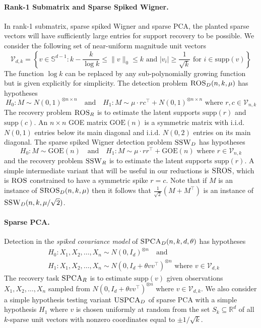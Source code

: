 \paragraph{Rank-1 Submatrix and Sparse Spiked Wigner.} In rank-1 submatrix, sparse spiked Wigner and sparse PCA, the planted sparse vectors will have sufficiently large entries for support recovery to be possible. We consider the following set of near-uniform magnitude unit vectors
$$\mathcal{V}_{d,k} = \left\{ v \in \mathbb{S}^{d-1}  : k - \frac{k}{\log k} \le \| v \|_0 \le k \text{ and } |v_i| \ge \frac{1}{\sqrt{k}} \text{ for } i \in \text{supp}(v) \right\}$$
The function $\log k$ can be replaced by any sub-polynomially growing function but is given explicitly for simplicity. The detection problem $\textsc{ROS}_D(n, k, \mu)$ has hypotheses
$$H_0: M \sim N(0, 1)^{\otimes n \times n} \quad \text{and} \quad H_1 : M \sim \mu \cdot rc^\top + N(0, 1)^{\otimes n \times n} \text{ where } r, c \in \mathcal{V}_{n, k}$$
The recovery problem $\textsc{ROS}_R$ is to estimate the latent supports $\text{supp}(r)$ and $\text{supp}(c)$. An $n \times n$ GOE matrix $\text{GOE}(n)$ is a symmetric matrix with i.i.d. $N(0, 1)$ entries below its main diagonal and i.i.d. $N(0, 2)$ entries on its main diagonal. The sparse spiked Wigner detection problem $\textsc{SSW}_D$ has hypotheses
$$H_0: M \sim \text{GOE}(n) \quad \text{and} \quad H_1 : M \sim \mu \cdot rr^\top + \text{GOE}(n) \text{ where } r \in \mathcal{V}_{n, k}$$
and the recovery problem $\textsc{SSW}_R$ is to estimate the latent supports $\text{supp}(r)$. A simple intermediate variant that will be useful in our reductions is $\textsc{SROS}$, which is $\textsc{ROS}$ constrained to have a symmetric spike $r = c$. Note that if $M$ is an instance of $\textsc{SROS}_D(n, k, \mu)$ then it follows that $\frac{1}{\sqrt{2}}(M + M^\top)$ is an instance of $\textsc{SSW}_D(n, k, \mu/\sqrt{2})$.

\paragraph{Sparse PCA.} Detection in the \emph{spiked covariance model} of $\textsc{SPCA}_D(n, k, d, \theta)$ has hypotheses
\begin{align*}
&H_0: X_1, X_2, \dots, X_n \sim N(0, I_d)^{\otimes n} \quad \text{and} \\
&H_1 : X_1, X_2, \dots, X_n \sim N\left(0, I_d + \theta vv^\top\right)^{\otimes n} \text{ where } v \in \mathcal{V}_{d, k}
\end{align*}
The recovery task $\textsc{SPCA}_R$ is to estimate $\text{supp}(v)$ given observations $X_1, X_2, \dots, X_n$ sampled from $N\left(0, I_d + \theta vv^\top\right)^{\otimes n}$ where $v \in \mathcal{V}_{d, k}$. We also consider a simple hypothesis testing variant $\textsc{USPCA}_D$ of sparse PCA with a simple hypothesis $H_1$ where $v$ is chosen uniformly at random from the set $S_k \subseteq \mathbb{R}^d$ of all $k$-sparse unit vectors with nonzero coordinates equal to $\pm 1/\sqrt{k}$.

